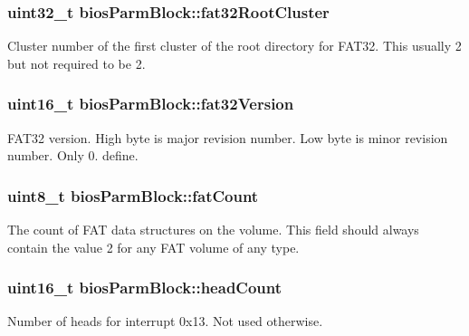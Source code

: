 \subsubsection[{fat32\+Root\+Cluster}]{\setlength{\rightskip}{0pt plus 5cm}uint32\+\_\+t bios\+Parm\+Block\+::fat32\+Root\+Cluster}\label{structbios_parm_block_a77ca01bd99f746e05dd872cbd2979937}
Cluster number of the first cluster of the root directory for F\+A\+T32. This usually 2 but not required to be 2. \hypertarget{structbios_parm_block_abad4f6f0c14dad9f5b7d43de94e685e8}{}
\subsubsection[{fat32\+Version}]{\setlength{\rightskip}{0pt plus 5cm}uint16\+\_\+t bios\+Parm\+Block\+::fat32\+Version}\label{structbios_parm_block_abad4f6f0c14dad9f5b7d43de94e685e8}
F\+A\+T32 version. High byte is major revision number. Low byte is minor revision number. Only 0. define. \hypertarget{structbios_parm_block_a7c03f147c3fb18f0df03d346050af13b}{}
\subsubsection[{fat\+Count}]{\setlength{\rightskip}{0pt plus 5cm}uint8\+\_\+t bios\+Parm\+Block\+::fat\+Count}\label{structbios_parm_block_a7c03f147c3fb18f0df03d346050af13b}
The count of F\+A\+T data structures on the volume. This field should always contain the value 2 for any F\+A\+T volume of any type. \hypertarget{structbios_parm_block_a2324ca82e2a7da4d91f458fa32a6e239}{}
\subsubsection[{head\+Count}]{\setlength{\rightskip}{0pt plus 5cm}uint16\+\_\+t bios\+Parm\+Block\+::head\+Count}\label{structbios_parm_block_a2324ca82e2a7da4d91f458fa32a6e239}
Number of heads for interrupt 0x13. Not used otherwise. \hypertarget{structbios_parm_block_a9413199be8525190d40589f60c22bcab}{}
